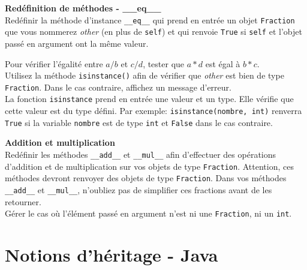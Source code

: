 \begin{Exercice}[15 minutes] \textbf{Redéfinition de méthodes - \_\_eq\_\_}\\
	Redéfinir la méthode d'instance \lstinline{__eq__} qui prend en entrée un objet \lstinline{Fraction} que vous nommerez \textit{other} (en plus de \lstinline{self}) et qui renvoie \lstinline{True} si \lstinline{self} et l'objet passé en argument ont la même valeur.
	\begin{conseil}
		Pour vérifier l'égalité entre $a/b$ et $c/d$, tester que $a*d$ est égal à $b*c$. \\
		Utilisez la méthode \lstinline{isinstance()} afin de vérifier que \textit{other} est bien de type \lstinline{Fraction}. Dans le cas contraire, affichez un message d'erreur.
		\\La fonction \lstinline{isinstance} prend en entrée une valeur et un type. Elle vérifie que cette valeur est du type défini. Par exemple: \lstinline{isinstance(nombre, int)} renverra \lstinline{True} si la variable \lstinline{nombre} est de type \lstinline{int} et \lstinline{False} dans le cas contraire.
	\end{conseil}
\end{Exercice}

\begin{Exercice}[15 minutes] \textbf{Addition et multiplication}\\
	Redéfinir les méthodes \lstinline{__add__} et \lstinline{__mul__} afin d'effectuer des opérations d'addition et de multiplication sur vos objets de type \lstinline{Fraction}. Attention, ces méthodes devront renvoyer des objets de type \lstinline{Fraction}. Dans vos méthodes \lstinline{__add__} et \lstinline{__mul__}, n'oubliez pas de simplifier ces fractions avant de les retourner.\\
	Gérer le cas où l'élément passé en argument n'est ni une \lstinline{Fraction}, ni un \lstinline{int}.
\end{Exercice}


\begin{solution}
	
\end{solution}
\begin{solution}
	
\end{solution}

\newpage

\section{Notions d'héritage - Java}

